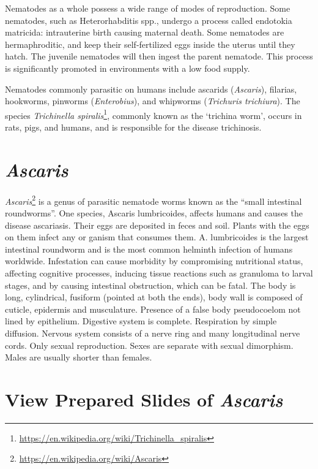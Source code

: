 \documentclass[]{book}
\let\rmarkdownfootnote\footnote%
\def\footnote{\protect\rmarkdownfootnote}
\renewcommand{\href}[2]{#2\footnote{\url{#1}}}
\begin{document}
Nematodes as a whole possess a wide range of modes of reproduction. Some nematodes, such as Heterorhabditis spp., undergo a process called endotokia matricida: intrauterine birth causing maternal death. Some nematodes are hermaphroditic, and keep their self-fertilized eggs inside the uterus until they hatch. The juvenile nematodes will then ingest the parent nematode. This process is significantly promoted in environments with a low food supply.

Nematodes commonly parasitic on humans include ascarids (\emph{Ascaris}), filarias, hookworms, pinworms (\emph{Enterobius}), and whipworms (\emph{Trichuris trichiura}). The species \href{https://en.wikipedia.org/wiki/Trichinella_spiralis}{\emph{Trichinella spiralis}}, commonly known as the `trichina worm', occurs in rats, pigs, and humans, and is responsible for the disease trichinosis.

\hypertarget{ascaris}{%
\section{\texorpdfstring{\emph{Ascaris}}{Ascaris}}\label{ascaris}}

\href{https://en.wikipedia.org/wiki/Ascaris}{\emph{Ascaris}} is a genus of parasitic nematode worms known as the ``small intestinal roundworms''. One species, Ascaris lumbricoides, affects humans and causes the disease ascariasis. Their eggs are deposited in feces and soil. Plants with the eggs on them infect any or ganism that consumes them. A. lumbricoides is the largest intestinal roundworm and is the most common helminth infection of humans worldwide. Infestation can cause morbidity by compromising nutritional status, affecting cognitive processes, inducing tissue reactions such as granuloma to larval stages, and by causing intestinal obstruction, which can be fatal.
The body is long, cylindrical, fusiform (pointed at both the ends), body wall is composed of cuticle, epidermis and musculature. Presence of a false body pseudocoelom not lined by epithelium. Digestive system is complete. Respiration by simple diffusion. Nervous system consists of a nerve ring and many longitudinal nerve cords. Only sexual reproduction. Sexes are separate with sexual dimorphism. Males are usually shorter than females.

\hypertarget{view-prepared-slides-of-ascaris}{%
\section{\texorpdfstring{View Prepared Slides of \emph{Ascaris}}{View Prepared Slides of Ascaris}}\label{view-prepared-slides-of-ascaris}}
\end{document}
